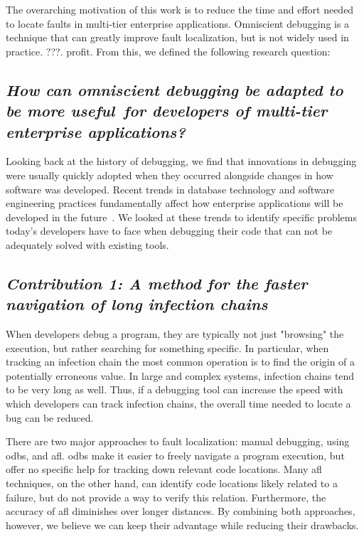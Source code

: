 \newcommand{\RQ}[1]{\subsection*{\emph{#1}}}

The overarching motivation of this work is to reduce the time and effort needed to locate faults in multi-tier enterprise applications.
Omniscient debugging is a technique that can greatly improve fault localization, but is not widely used in practice.
???. profit.
From this, we defined the following research question:

\RQ{How can omniscient debugging be adapted to be more useful\todo{say that in a better way}\ for developers of multi-tier enterprise applications?}

Looking back at the history of debugging, we find that innovations in debugging were usually quickly adopted when they occurred alongside changes in how software was developed.
Recent trends in database technology and software engineering practices fundamentally affect how enterprise applications will be developed in the future~\cite{plattner15:the_in-memory_revolution_how}.
We looked at these trends to identify specific problems today's developers have to face when debugging their code that can not be adequately solved with existing tools. 

\RQ{Contribution 1: A method for the faster navigation of long infection chains}

When developers debug a program, they are typically not just "browsing" the execution, but rather searching for something specific.
In particular, when tracking an infection chain the most common operation is to find the origin of a potentially erroneous value.
In large and complex systems, infection chains tend to be very long as well.
Thus, if a debugging tool can increase the speed with which developers can track infection chains, the overall time needed to locate a bug can be reduced.

There are two major approaches to fault localization: manual debugging, \eg using \acfp{odb}, and \acf{afl}.
\Acp{odb} make it easier to freely navigate a program execution, but offer no specific help for tracking down relevant code locations.
Many \ac{afl} techniques, on the other hand, can identify code locations likely related to a failure, but do not provide a way to verify this relation.
Furthermore, the accuracy of \ac{afl} diminishes over longer distances.
By combining both approaches, however, we believe we can keep their advantage while reducing their drawbacks.

